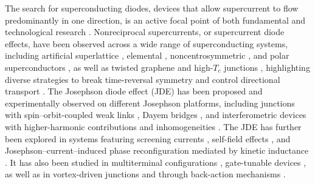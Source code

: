 \documentclass[prl,twocolumn,superscriptaddress,showpacs,nofootinbib]{revtex4-2}
\begin{document}
The search for superconducting diodes, devices that allow supercurrent to flow predominantly in one direction, is an active focal point of both fundamental and technological research \cite{and20,baur22, bau22, wu22,jeo22,nad23,Ghosh2024}.
Nonreciprocal supercurrents, or supercurrent diode effects, have been observed across a wide range of superconducting systems, including artificial superlattice \cite{and20,narita2022}, elemental \cite{Margineda2023}, noncentrosymmetric \cite{wakatsuki2017}, and polar superconductors \cite{itahashi2020}, as well as twisted graphene \cite{lin2022,Rothstein2026} and high-$T_c$ junctions \cite{G2024,Qi2025,Guo2025,Volkov_2024}, highlighting diverse strategies to break time-reversal symmetry and control directional transport \cite{and20,wakatsuki2017,zhang2020,itahashi2020,narita2022,lin2022, yerin2024,Yerin_SQUID}.
The Josephson diode effect (JDE) has been proposed and experimentally observed on different Josephson platforms, including junctions with spin–orbit-coupled weak links \cite{baumgartner2022,Costa2023,lotfizadeh2024,Borgongino2025}, Dayem bridges \cite{souto2022,MertBorzkurt2023,margineda2023sign}, and interferometric devices with higher-harmonic contributions \cite{greco2023,greco2024} and inhomogeneities \cite{Chirolli2025}.
The JDE has further been explored in systems featuring screening currents \cite{hou2023,sundaresh2023}, self-field effects \cite{krasnov1997,golod2022}, and Josephson--current--induced phase reconfiguration mediated by kinetic inductance \cite{chen2024}. It has also been studied in multiterminal configurations \cite{gupta2023,zhang2024}, gate-tunable devices \cite{ciaccia2023,gupta2023}, as well as in vortex-driven junctions \cite{Golod2010,Golod2015,golod2022,GutfreundNatComms2023,Ji21,Fukaya2025} and through back-action mechanisms \cite{de2024quasi}.
\end{document}
